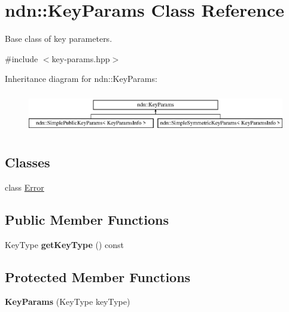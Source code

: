 \hypertarget{classndn_1_1KeyParams}{}\section{ndn\+:\+:Key\+Params Class Reference}
\label{classndn_1_1KeyParams}


Base class of key parameters.  




{\ttfamily \#include $<$key-\/params.\+hpp$>$}

Inheritance diagram for ndn\+:\+:Key\+Params\+:\begin{figure}[H]
\begin{center}
\leavevmode
\includegraphics[height=1.777778cm]{classndn_1_1KeyParams}
\end{center}
\end{figure}
\subsection*{Classes}
\begin{DoxyCompactItemize}
\item 
class \hyperlink{classndn_1_1KeyParams_1_1Error}{Error}
\end{DoxyCompactItemize}
\subsection*{Public Member Functions}
\begin{DoxyCompactItemize}
\item 
Key\+Type {\bfseries get\+Key\+Type} () const\hypertarget{classndn_1_1KeyParams_a9392ab104e0e23d42879a06a0c7259c4}{}\label{classndn_1_1KeyParams_a9392ab104e0e23d42879a06a0c7259c4}

\end{DoxyCompactItemize}
\subsection*{Protected Member Functions}
\begin{DoxyCompactItemize}
\item 
{\bfseries Key\+Params} (Key\+Type key\+Type)\hypertarget{classndn_1_1KeyParams_ab73bfae0f4d335b263d8e1e4f0983bf7}{}\label{classndn_1_1KeyParams_ab73bfae0f4d335b263d8e1e4f0983bf7}

\end{DoxyCompactItemize}


